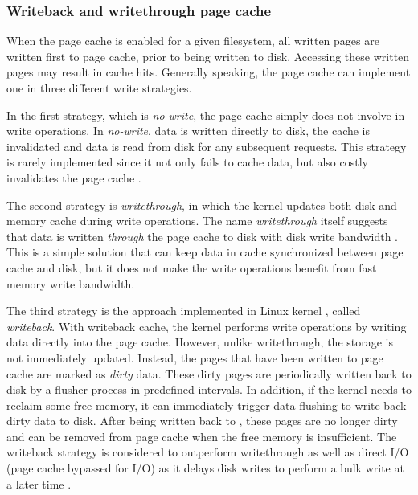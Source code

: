 \subsubsection{Writeback and writethrough page cache}

When the page cache is enabled for a given filesystem, all written pages 
are written first to page cache, prior to being written to disk.
Accessing these written pages may result in cache hits.
Generally speaking, the page cache can implement one in three 
different write strategies.

In the first strategy, which is \textit{no-write}, the page cache simply 
does not involve in write operations. In \textit{no-write}, data is written 
directly to disk, the cache is invalidated and data is read from disk for any 
subsequent requests. 
This strategy is rarely implemented since it not only fails to cache data, 
but also costly invalidates the page cache \cite{linuxdev3rd2010}.

The second strategy is \textit{writethrough}, in which the kernel updates both 
disk and memory cache during write operations. The name \textit{writethrough} 
itself suggests that data is written \textit{through} the page cache to disk 
with disk write bandwidth \cite{linuxdev3rd2010}.
This is a simple solution that can keep data in cache synchronized 
between page cache and disk, but it does not make the write operations 
benefit from fast memory write bandwidth. 

The third strategy is the approach implemented in Linux kernel ,
called \textit{writeback}. 
With writeback cache, the kernel performs write operations by writing data 
directly into the page cache. However, unlike writethrough, the storage is not 
immediately updated. Instead, the pages that have been written to page cache 
are marked as \textit{dirty} data. These dirty pages are periodically written 
back to disk by a flusher process in predefined intervals. 
In addition, if the kernel needs to reclaim some free memory, it can 
immediately trigger data flushing to write back dirty data to disk. 
After being written back to  , these pages are no longer dirty 
and can be removed from page cache when the free memory is insufficient.
The writeback strategy is considered to outperform writethrough as well as
direct I/O (page cache bypassed for I/O) as it delays disk writes to perform 
a bulk write at a later time \cite{linuxdev3rd2010}. 

